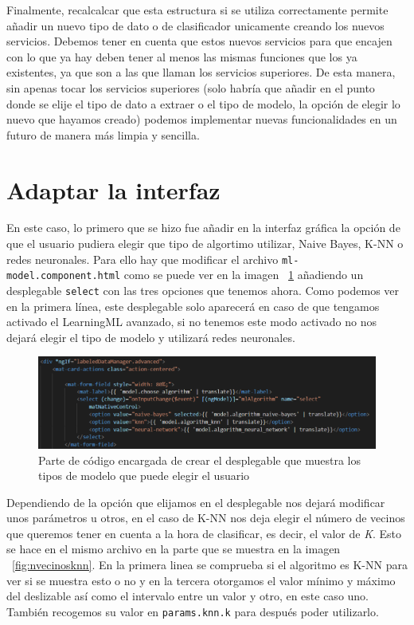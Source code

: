 \documentclass[a4paper, 12pt]{book}
\begin{document}
Finalmente, recalcalcar que esta estructura si se utiliza correctamente permite añadir un nuevo tipo de dato o de clasificador unicamente creando los nuevos servicios. Debemos tener en cuenta que estos nuevos servicios para que encajen con lo que ya hay deben tener al menos las mismas funciones que los ya existentes, ya que son a las que llaman los servicios superiores. De esta manera, sin apenas tocar los servicios superiores (solo habría que añadir en el punto donde se elije el tipo de dato a extraer o el tipo de modelo, la opción de elegir lo nuevo que hayamos creado) podemos implementar nuevas funcionalidades en un futuro de manera más limpia y sencilla.



\section{Adaptar la interfaz} 
\label{sec:interfaz}

En este caso, lo primero que se hizo fue añadir en la interfaz gráfica la opción de que el usuario pudiera elegir que tipo de algortimo utilizar, Naive Bayes, K-NN o redes neuronales. Para ello hay que modificar el archivo \texttt{ml-model.component.html} como se puede ver en la imagen ~\ref{fig:desplegable} añadiendo un desplegable \texttt{select} con las tres opciones que tenemos ahora. Como podemos ver en la primera línea, este desplegable solo aparecerá en caso de que tengamos activado el LearningML avanzado, si no tenemos este modo activado no nos dejará elegir el tipo de modelo y utilizará redes neuronales.\\

\begin{figure}
	\centering
	\includegraphics[width=12cm, keepaspectratio]{img/desplegable}
	\caption{Parte de código encargada de crear el desplegable que muestra los tipos de modelo que puede elegir el usuario}									\label{fig:desplegable}
\end{figure}

Dependiendo de la opción que elijamos en el desplegable nos dejará modificar unos parámetros u otros, en el caso de K-NN nos deja elegir el número de vecinos que queremos tener en cuenta a la hora de clasificar, es decir, el valor de \emph{K}. Esto se hace en el mismo archivo en la parte que se muestra en la imagen ~\ref{fig:nvecinosknn}. En la primera linea se comprueba si el algoritmo es K-NN para ver si se muestra esto o no y en la tercera otorgamos el valor mínimo y máximo del deslizable así como el intervalo entre un valor y otro, en este caso uno. También recogemos su valor en \texttt{params.knn.k} para después poder utilizarlo.
\end{document}
